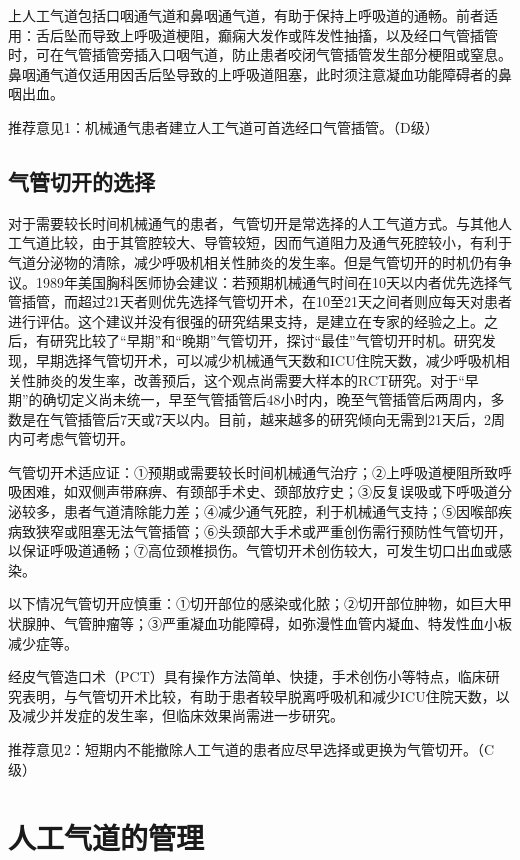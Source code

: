 上人工气道包括口咽通气道和鼻咽通气道，有助于保持上呼吸道的通畅。前者适用：舌后坠而导致上呼吸道梗阻，癫痫大发作或阵发性抽搐，以及经口气管插管时，可在气管插管旁插入口咽气道，防止患者咬闭气管插管发生部分梗阻或窒息。鼻咽通气道仅适用因舌后坠导致的上呼吸道阻塞，此时须注意凝血功能障碍者的鼻咽出血。

推荐意见1：机械通气患者建立人工气道可首选经口气管插管。（D级）

\subsection{气管切开的选择}

对于需要较长时间机械通气的患者，气管切开是常选择的人工气道方式。与其他人工气道比较，由于其管腔较大、导管较短，因而气道阻力及通气死腔较小，有利于气道分泌物的清除，减少呼吸机相关性肺炎的发生率。但是气管切开的时机仍有争议。1989年美国胸科医师协会建议：若预期机械通气时间在10天以内者优先选择气管插管，而超过21天者则优先选择气管切开术，在10至21天之间者则应每天对患者进行评估。这个建议并没有很强的研究结果支持，是建立在专家的经验之上。之后，有研究比较了“早期”和“晚期”气管切开，探讨“最佳”气管切开时机。研究发现，早期选择气管切开术，可以减少机械通气天数和ICU住院天数，减少呼吸机相关性肺炎的发生率，改善预后，这个观点尚需要大样本的RCT研究。对于“早期”的确切定义尚未统一，早至气管插管后48小时内，晚至气管插管后两周内，多数是在气管插管后7天或7天以内。目前，越来越多的研究倾向无需到21天后，2周内可考虑气管切开。

气管切开术适应证：①预期或需要较长时间机械通气治疗；②上呼吸道梗阻所致呼吸困难，如双侧声带麻痹、有颈部手术史、颈部放疗史；③反复误吸或下呼吸道分泌较多，患者气道清除能力差；④减少通气死腔，利于机械通气支持；⑤因喉部疾病致狭窄或阻塞无法气管插管；⑥头颈部大手术或严重创伤需行预防性气管切开，以保证呼吸道通畅；⑦高位颈椎损伤。气管切开术创伤较大，可发生切口出血或感染。

以下情况气管切开应慎重：①切开部位的感染或化脓；②切开部位肿物，如巨大甲状腺肿、气管肿瘤等；③严重凝血功能障碍，如弥漫性血管内凝血、特发性血小板减少症等。

经皮气管造口术（PCT）具有操作方法简单、快捷，手术创伤小等特点，临床研究表明，与气管切开术比较，有助于患者较早脱离呼吸机和减少ICU住院天数，以及减少并发症的发生率，但临床效果尚需进一步研究。

推荐意见2：短期内不能撤除人工气道的患者应尽早选择或更换为气管切开。（C级）

\section{人工气道的管理}


